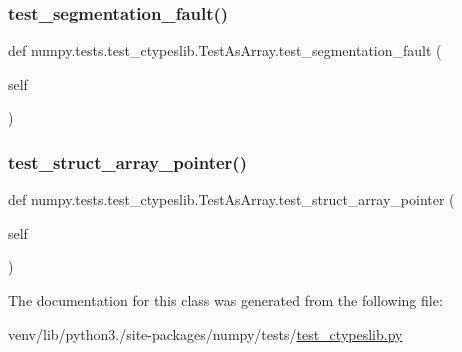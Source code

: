 \subsubsection{\texorpdfstring{test\+\_\+segmentation\+\_\+fault()}{test\_segmentation\_fault()}}
{\footnotesize\ttfamily def numpy.\+tests.\+test\+\_\+ctypeslib.\+Test\+As\+Array.\+test\+\_\+segmentation\+\_\+fault (\begin{DoxyParamCaption}\item[{}]{self }\end{DoxyParamCaption})}

\mbox{\label{classnumpy_1_1tests_1_1test__ctypeslib_1_1TestAsArray_a445a6d98c05b3a33dd6ebaaaab766fcc}} 
\subsubsection{\texorpdfstring{test\+\_\+struct\+\_\+array\+\_\+pointer()}{test\_struct\_array\_pointer()}}
{\footnotesize\ttfamily def numpy.\+tests.\+test\+\_\+ctypeslib.\+Test\+As\+Array.\+test\+\_\+struct\+\_\+array\+\_\+pointer (\begin{DoxyParamCaption}\item[{}]{self }\end{DoxyParamCaption})}



The documentation for this class was generated from the following file\+:\begin{DoxyCompactItemize}
\item 
venv/lib/python3./site-\/packages/numpy/tests/\hyperlink{test__ctypeslib_8py}{test\+\_\+ctypeslib.\+py}\end{DoxyCompactItemize}
